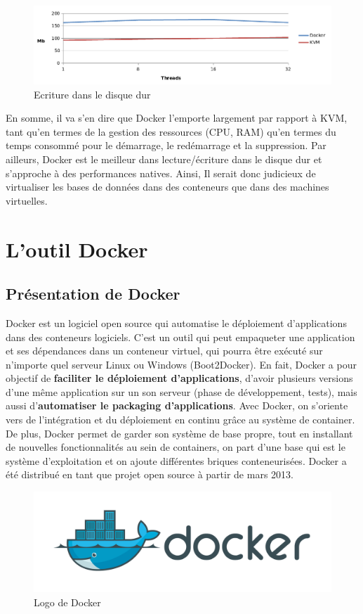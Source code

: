 \begin{onehalfspace}
\begin{figure}[H]
\centering
\includegraphics [width=160mm]{chapitre2/assets/file-io-write.png}
\caption{Ecriture dans le disque dur}
\label{fig:}
\end{figure}


En somme, il va s'en dire que Docker l'emporte largement par rapport à KVM, tant qu'en termes de la gestion des ressources (CPU, RAM) qu'en termes du temps consommé pour le démarrage, le redémarrage et la suppression. Par ailleurs, Docker est le meilleur dans lecture/écriture dans le disque dur et s'approche à des performances natives. Ainsi, Il serait donc judicieux de virtualiser les bases de données dans des conteneurs que dans des machines virtuelles. 







\section{L'outil Docker}
\subsection{Présentation de Docker}
Docker est un logiciel open source qui automatise le déploiement d'applications dans des conteneurs logiciels. C'est un outil qui peut empaqueter une application et ses dépendances dans un conteneur virtuel, qui pourra être exécuté sur n'importe quel serveur Linux ou Windows (Boot2Docker). En fait, Docker a pour objectif de \textbf{faciliter le déploiement d’applications}, d’avoir plusieurs versions d’une même application sur un son serveur (phase de développement, tests), mais aussi d’\textbf{automatiser le packaging d’applications}. Avec Docker, on s’oriente vers de l’intégration et du déploiement en continu grâce au système de container. De plus, Docker permet de garder son système de base propre, tout en installant de nouvelles fonctionnalités au sein de containers, on part d’une base qui est le système d’exploitation et on ajoute différentes briques conteneurisées. Docker a été distribué en tant que projet open source à partir de mars 2013.
\begin{figure}[H]
\centering
\includegraphics [scale=0.5]{chapitre2/assets/docker.png}
\caption{Logo de Docker}
\end{figure}


\end{onehalfspace}
